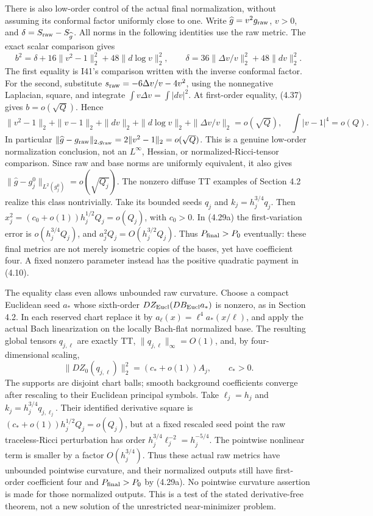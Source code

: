 \documentclass[
  10pt,
]{article}
\begin{document}
There is also low-order control of the actual final normalization,
without assuming its conformal factor uniformly close to one. Write
\(\widehat g=v^2g_{\rm raw}\), \(v>0\), and
\(\delta=S_{\rm raw}-S_{\widehat g}\). All norms in the following
identities use the raw metric. The exact scalar comparison gives \[
 b^2=\delta+16\|v^2-1\|_2^2
                       +48\|d\log v\|_2^2,\qquad
 \delta=36\|\Delta v/v\|_2^2+48\|dv\|_2^2. \tag{4.40a}
\] The first equality is I41's comparison written with the inverse
conformal factor. For the second, substitute
\(s_{\rm raw}=-6\Delta v/v-4v^2\), using the nonnegative Laplacian,
square, and integrate \(\int v\Delta v=\int|dv|^2\). At first-order
equality, (4.37) gives \(b=o(\sqrt Q)\). Hence \[
 \|v^2-1\|_2+\|v-1\|_2+\|dv\|_2+
       \|d\log v\|_2+\|\Delta v/v\|_2=o(\sqrt Q),
 \quad \int|v-1|^4=o(Q). \tag{4.40b}
\] In particular
\(\|\widehat g-g_{\rm raw}\|_{2,g_{\rm raw}} =2\|v^2-1\|_2=o(\sqrt Q)\).
This is a genuine low-order normalization conclusion, not an
\(L^\infty\), Hessian, or normalized-Ricci-tensor comparison. Since raw
and base norms are uniformly equivalent, it also gives
\(\|\widehat g-g_j^0\|_{L^2(g_j^0)}=o(\sqrt{Q_j})\). The nonzero diffuse
TT examples of Section 4.2 realize this class nontrivially. Take its
bounded seeds \(q_j\) and \(k_j=h_j^{3/4}q_j\). Then
\(x_j^2=(c_0+o(1))h_j^{1/2}Q_j=o(Q_j)\), with \(c_0>0\). In (4.29a) the
first-variation error is \(o(h_j^{3/4}Q_j)\), and
\(a_j^2Q_j=O(h_j^{3/2}Q_j)\). Thus \(P_{\rm final}>P_0\) eventually:
these final metrics are not merely isometric copies of the bases, yet
have coefficient four. A fixed nonzero parameter instead has the
positive quadratic payment in (4.10).

The equality class even allows unbounded raw curvature. Choose a compact
Euclidean seed \(a_*\) whose sixth-order
\(DZ_{\rm Eucl}(DB_{\rm Eucl}a_*)\) is nonzero, as in Section 4.2. In
each reserved chart replace it by \(a_\ell(x)=\ell^4a_*(x/\ell)\), and
apply the actual Bach linearization on the locally Bach-flat normalized
base. The resulting global tensors \(q_{j,\ell}\) are exactly TT,
\(\|q_{j,\ell}\|_\infty=O(1)\), and, by four-dimensional scaling, \[
 \|DZ_0(q_{j,\ell})\|_2^2=(c_*+o(1))A_j,\qquad c_*>0.
\] The supports are disjoint chart balls; smooth background coefficients
converge after rescaling to their Euclidean principal symbols. Take
\(\ell_j=h_j\) and \(k_j=h_j^{3/4}q_{j,\ell_j}\). Their identified
derivative square is \((c_*+o(1))h_j^{1/2}Q_j=o(Q_j)\), but at a fixed
rescaled seed point the raw traceless-Ricci perturbation has order
\(h_j^{3/4}\ell_j^{-2}=h_j^{-5/4}\). The pointwise nonlinear term is
smaller by a factor \(O(h_j^{3/4})\). Thus these actual raw metrics have
unbounded pointwise curvature, and their normalized outputs still have
first-order coefficient four and \(P_{\rm final}>P_0\) by (4.29a). No
pointwise curvature assertion is made for those normalized outputs. This
is a test of the stated derivative-free theorem, not a new solution of
the unrestricted near-minimizer problem.
\end{document}
